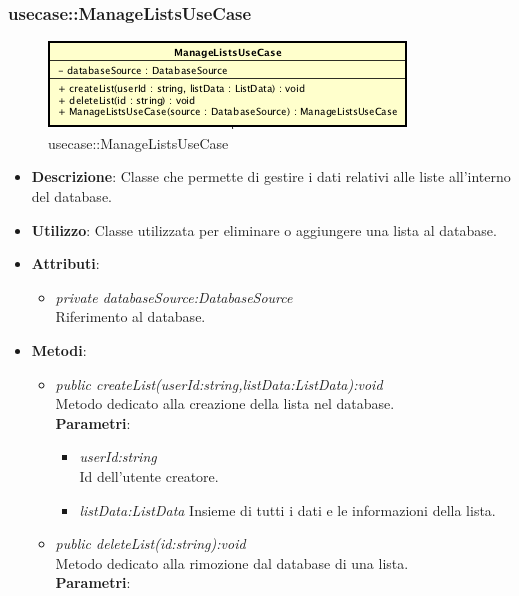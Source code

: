 \subsubsection{usecase::ManageListsUseCase}

\label{usecase::ManageListsUseCase}
\begin{figure}[ht]
	\centering
	\includegraphics[scale=0.5]{Sezioni/SottosezioniST/img/app/ManageListsUseCase.png}
	\caption{usecase::ManageListsUseCase}
\end{figure}

\begin{itemize}
\item \textbf{Descrizione}: Classe che permette di gestire i dati relativi alle liste all'interno del database.
\item \textbf{Utilizzo}: Classe utilizzata per eliminare o aggiungere una lista al database.
\item \textbf{Attributi}: 
	\begin{itemize}
	\item \textit{private databaseSource:DatabaseSource}\\
		Riferimento al database.
	\end{itemize}
\item \textbf{Metodi}:
	\begin{itemize}
	\item \textit{public createList(userId:string,listData:ListData):void}\\
		Metodo dedicato alla creazione della lista nel database.
			\\ \textbf{Parametri}: \begin{itemize}
			\item \textit{userId:string}\\
			Id dell'utente creatore.
			\item \textit{listData:ListData}
			Insieme di tutti i dati e le informazioni della lista.
			\end{itemize} 
	\item \textit{public deleteList(id:string):void}\\
	Metodo dedicato alla rimozione dal database di una lista.
			\\ \textbf{Parametri}: \begin{itemize}

\end{itemize}
\end{itemize}
\end{itemize}
